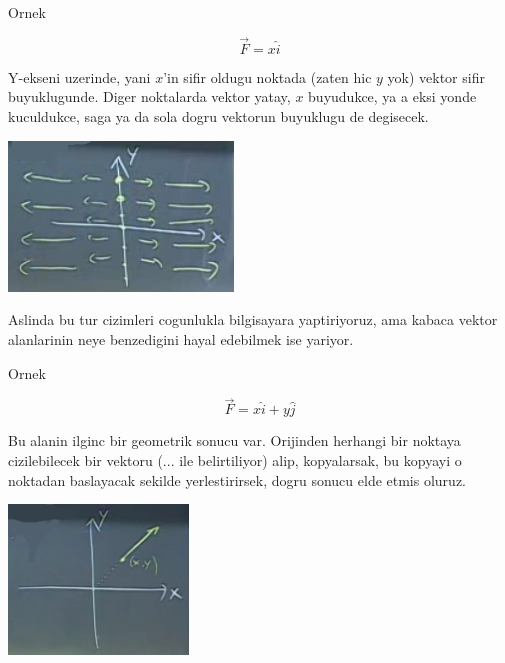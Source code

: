 \documentclass[12pt,fleqn]{article}
\begin{document}
Ornek

\[ \vec{F} = x\hat{i} \]

Y-ekseni uzerinde, yani $x$'in sifir oldugu noktada (zaten hic $y$ yok)
vektor sifir buyuklugunde. Diger noktalarda vektor yatay, $x$ buyudukce, ya
a eksi yonde kuculdukce, saga ya da sola dogru vektorun buyuklugu de
degisecek.

\includegraphics[height=4cm]{19_2.png}

Aslinda bu tur cizimleri cogunlukla bilgisayara yaptiriyoruz, ama kabaca
vektor alanlarinin neye benzedigini hayal edebilmek ise yariyor. 

Ornek

\[ \vec{F} = x\hat{i} + y\hat{j} \]

Bu alanin ilginc bir geometrik sonucu var.  Orijinden herhangi bir noktaya
cizilebilecek bir vektoru (... ile belirtiliyor) alip, kopyalarsak, bu
kopyayi o noktadan baslayacak sekilde yerlestirirsek, dogru sonucu elde
etmis oluruz.

\includegraphics[height=4cm]{19_3.png}
\end{document}
